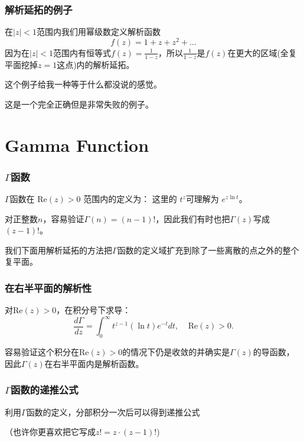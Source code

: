 \documentclass[CJK, 13pt]{beamer}
\begin{document}
\begin{frame}
  \frametitle{解析延拓的例子}
  
  在$|z|<1$范围内我们用幂级数定义解析函数
  $$f(z) = 1+z+z^2+\ldots$$
  因为在$|z|<1$范围内有恒等式$f(z) = \frac{1}{1-z}$，所以$\frac{1}{1-z}$是$f(z)$在更大的区域(全复平面挖掉$z=1$这点)内的解析延拓。


  \skiplines
  
  \wulian 这个例子给我一种等于什么都没说的感觉。
  
  \bye 这是一个完全正确但是非常失败的例子。

  
\end{frame}

\section{Gamma Function}

\begin{frame}
  \frametitle{$\Gamma$函数}
  
  $\Gamma$函数在 $\mathrm{Re}(z) > 0$ 范围内的定义为：
  这里的 $t^z$可理解为 $e^{z\ln t}$。


  \skipline

  对正整数$n$，容易验证$\Gamma(n) = (n-1)!$，因此我们有时也把$\Gamma(z)$写成$(z-1)!$。

  \skiplines
  
  我们下面用解析延拓的方法把$\Gamma$函数的定义域扩充到除了一些离散的点之外的整个复平面。
  
  
\end{frame}


\begin{frame}
  \frametitle{在右半平面的解析性}
  
  对$\mathrm{Re}(z)>0$，在积分号下求导：
  $$\frac{d\Gamma}{dz} = \int_0^\infty t^{z-1} (\ln t) e^{-t}dt,  \ \ \ \ \ \mathrm{Re}(z)>0.$$

  容易验证这个积分在$\mathrm{Re}(z)>0$的情况下仍是收敛的并确实是$\Gamma(z)$的导函数，因此$\Gamma(z)$在右半平面内是解析函数。
  
  
\end{frame}

\begin{frame}
  \frametitle{$\Gamma$函数的递推公式}
  
  利用$\Gamma$函数的定义，分部积分一次后可以得到递推公式

 （也许你更喜欢把它写成$z! = z \cdot (z-1)!$)
  
\end{frame}
\end{document}
